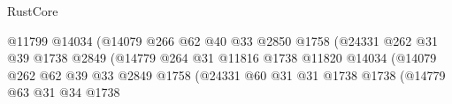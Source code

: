 \begin{lexlean}{RustCore}
\begin{coremodule}
                                                      @11799
                                                      @14034
                                                      (@14079
                                                        @266
                                                        @62
                                                        @40
                                                        @33
                                                        @2850
                                                        @1758
                                                        (@24331
                                                          @262
                                                          @31
                                                          @39
                                                          @1738
                                                          @2849
                                                          (@14779
                                                            @264
                                                            @31
                                                            @11816
                                                            @1738
                                                            @11820
                                                            @14034
                                                            (@14079
                                                              @262
                                                              @62
                                                              @39
                                                              @33
                                                              @2849
                                                              @1758
                                                              (@24331
                                                                @60
                                                                @31
                                                                @31
                                                                @1738
                                                                @1738
                                                                (@14779
                                                                  @63
                                                                  @31
                                                                  @34
                                                                  @1738

\end{coremodule}
\end{lexlean}
